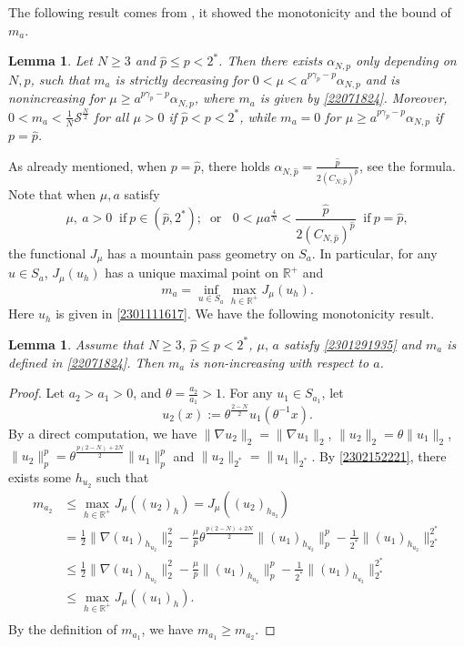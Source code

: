 \documentclass[10pt]{article}
\numberwithin{equation}{section}
\newtheorem{lemma}[theorem]{Lemma}
\numberwithin{equation}{section}
\begin{document}
The following result comes from \cite[Lemma 3.3]{WW22}, it showed the monotonicity and the bound of $m_a$.
\begin{lemma}\label{2301312159}
Let $N\ge 3$ and $\hat{p}\le p<2^*$. Then there exists $\alpha_{N, p}$ only depending on $N, p$, such that $m_{a}$ is strictly decreasing for $0<\mu<a^{{p\gamma_p-p}}\alpha_{N, p}$ and is nonincreasing for $\mu\ge a^{{p\gamma_p-p}}\alpha_{N, p}$, where $m_a$ is given by \eqref{22071824}. Moreover, $0<m_a<\frac{1}{N}\mathcal{S}^{\frac{N}{2}}$ for all $\mu > 0$ if $\hat{p} < p<2^*$, while $m_a=0$ for $\mu\ge a^{{p\gamma_p-p}}\alpha_{N, p}$ if $p=\hat{p}$.
\end{lemma}
As already mentioned, when $p=\hat{p}$, there holds $\alpha_{N, \hat{p}}=\frac{\hat{p}}{2(C_{N, \hat{p}})^{\hat{p}}}$, see the formula\cite[(3.13)]{WW22}. Note that when $\mu, a$ satisfy
\begin{equation}\label{2301291935}
\mu,~ a>0\;\;\text{if}~p\in (\hat{p}, 2^*); \;\; \mbox{or }\;\;
0<\mu a^{\frac4N}<\frac{\hat{p}}{2(C_{N, \hat{p}})^{\hat{p}}}\;\; \text{if}~p=\hat{p},
\end{equation}
the functional $J_{\mu}$ has a mountain pass geometry on $S_a$. In particular, for any $u\in S_a$, $J_{\mu}(u_h)$ has a unique maximal point on $\mathbb{R}^+$ and
\begin{equation}\label{2302152221}
m_{a}=\underset{u\in S_a}{\inf}\underset{h\in \mathbb{R}^+}{\max}J_{\mu}(u_h).
\end{equation}
Here $u_h$ is given in \eqref{2301111617}. We have the following monotonicity result.
\begin{lemma}\label{2207092032}
Assume that $N\ge 3$, $\hat{p}\le p<2^*$, $\mu, \, a$ satisfy \eqref{2301291935} and $m_a$ is defined in \eqref{22071824}. Then $m_a$ is non-increasing with respect to $a$.
\end{lemma}
\begin{proof}
Let $a_2>a_1>0$, and $\theta=\frac{a_2}{a_1}>1$. For any $u_1\in S_{a_1}$, let
\[
u_2(x):=\theta^{\frac{2-N}{2}}u_1(\theta^{-1}x).
\]
By a direct computation, we have $\|\nabla u_2\|_2=\|\nabla u_1\|_2$, $\|u_2\|_2 =\theta \|u_1\|_2$, $\|u_2\|_p^p=\theta^{\frac{p(2-N)+2N}{2}} \|u_1\|_p^p$ and $\|u_2\|_{2^*} =\|u_1\|_{2^*}$. By \eqref{2302152221}, there exists some $h_{u_2}$ such that
\[
\begin{aligned}
m_{a_2} &\le \underset{h\in \mathbb{R}^+}{\max} J_{\mu}((u_2)_{h})=J_{\mu}((u_2)_{h_{u_2}})\\
&=\frac12 \|\nabla (u_1)_{h_{u_2}}\|_2^2-\frac{\mu}{p}\theta^{\frac{p(2-N)+2N}{2}}\|(u_1)_{h_{u_2}}\|_p^p-\frac{1}{2^*}\|(u_1)_{h_{u_2}}\|_{2^*}^{2^*}\\
&\le \frac12 \|\nabla (u_1)_{h_{u_2}}\|_2^2-\frac{\mu}{p}\|(u_1)_{h_{u_2}}\|_p^p-\frac{1}{2^*}\|(u_1)_{h_{u_2}}\|_{2^*}^{2^*}\\
&\le \underset{h\in \mathbb{R}^+}{\max} J_{\mu}((u_1)_{h}).\\
\end{aligned}
\]
By the definition of $m_{a_1}$, we have  $m_{a_1}\ge m_{a_2}$.
\end{proof}
\end{document}
